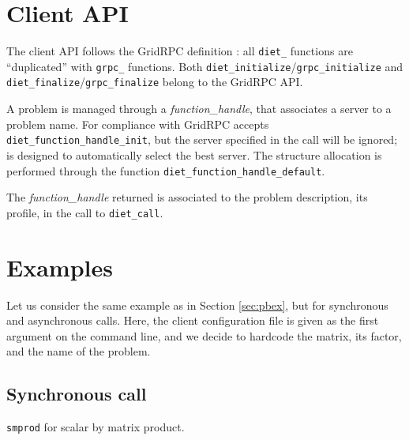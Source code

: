 \section{Client API}
\label{sec:clAPI}

The client API follows the GridRPC definition \cite{gridRPC:02}: all
\texttt{diet\_} functions are ``duplicated'' with \texttt{grpc\_}
functions.  Both \texttt{diet\_initialize}/\texttt{grpc\_initialize}
and \texttt{diet\_finalize}/\texttt{grpc\_finalize} belong to the
GridRPC API. 
 
    A problem is managed through a \emph{function\_handle}, that
associates a server to a problem name. For compliance with GridRPC
\diet accepts \texttt{diet\_function\_handle\_init}, but the server 
specified in the call will be ignored; \diet is designed to
automatically select the best server. The structure allocation is
performed through the function
\texttt{diet\_function\_handle\_default}.

The \emph{function\_handle} returned is associated to the problem description,
its profile, in the call to \texttt{diet\_call}.

\section{Examples}
\label{sec:cl_ex}

Let us consider the same example as in Section \ref{sec:pbex}, but
for synchronous and asynchronous calls.  Here, the client
configuration file is given as the first argument on the command
line, and we decide to hardcode the matrix, its factor, and the name
of the problem.

\subsection{Synchronous call}
\texttt{smprod}
for scalar by matrix product.

